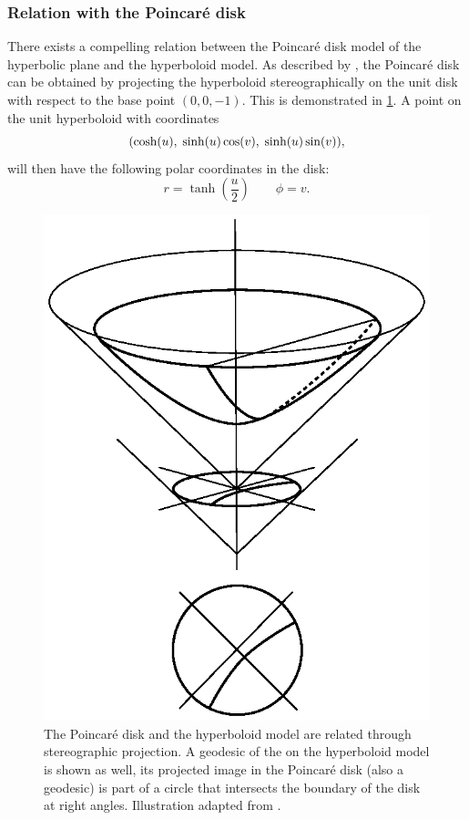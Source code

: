 \subsubsection{Relation with the Poincaré disk}
There exists a compelling relation between the Poincaré disk model of the hyperbolic plane and the hyperboloid model. As described by \citet{Balazs1986}, the Poincaré disk can be obtained by projecting the hyperboloid stereographically on the unit disk with respect to the base point $(0, 0, -1)$. This is demonstrated in \cref{fig:hyperboloid_disk}. A point on the unit hyperboloid with coordinates
$$ \qty(\cosh(u),\;\sinh(u)\cos(v),\;\sinh(u)\sin(v)), $$
will then have the following polar coordinates in the disk:
$$ r = \tanh(\frac{u}{2}) \qquad \phi = v.$$
\begin{figure}[ht]
    \centering
    \includegraphics{media/vector/hyperboloid_projection.eps}
    \caption{The Poincaré disk and the hyperboloid model are related through stereographic projection. A geodesic of the on the hyperboloid model is shown as well, its projected image in the Poincaré disk (also a geodesic) is part of a circle that intersects the boundary of the disk at right angles. Illustration adapted from \citet{Balazs1986}.}
    \label{fig:hyperboloid_disk}
\end{figure}

